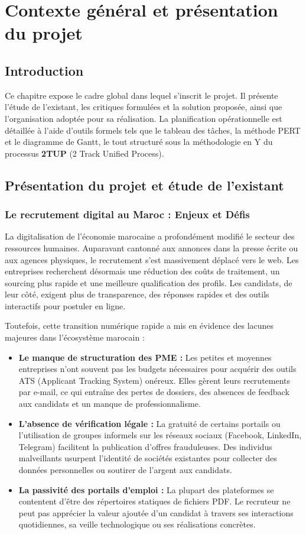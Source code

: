\chapter{Contexte général et présentation du projet}

\section{Introduction}
Ce chapitre expose le cadre global dans lequel s'inscrit le projet. Il présente l'étude de l'existant, les critiques formulées et la solution proposée, ainsi que l'organisation adoptée pour sa réalisation. La planification opérationnelle est détaillée à l'aide d'outils formels tels que le tableau des tâches, la méthode PERT et le diagramme de Gantt, le tout structuré sous la méthodologie en Y du processus \textbf{2TUP} (2 Track Unified Process).

\section{Présentation du projet et étude de l'existant}
\subsection{Le recrutement digital au Maroc : Enjeux et Défis}
La digitalisation de l'économie marocaine a profondément modifié le secteur des ressources humaines. Auparavant cantonné aux annonces dans la presse écrite ou aux agences physiques, le recrutement s'est massivement déplacé vers le web. Les entreprises recherchent désormais une réduction des coûts de traitement, un sourcing plus rapide et une meilleure qualification des profils. Les candidats, de leur côté, exigent plus de transparence, des réponses rapides et des outils interactifs pour postuler en ligne.

Toutefois, cette transition numérique rapide a mis en évidence des lacunes majeures dans l'écosystème marocain :
\begin{itemize}
    \item \textbf{Le manque de structuration des PME :} Les petites et moyennes entreprises n'ont souvent pas les budgets nécessaires pour acquérir des outils ATS (Applicant Tracking System) onéreux. Elles gèrent leurs recrutements par e-mail, ce qui entraîne des pertes de dossiers, des absences de feedback aux candidats et un manque de professionnalisme.
    \item \textbf{L'absence de vérification légale :} La gratuité de certains portails ou l'utilisation de groupes informels sur les réseaux sociaux (Facebook, LinkedIn, Telegram) facilitent la publication d'offres frauduleuses. Des individus malveillants usurpent l'identité de sociétés existantes pour collecter des données personnelles ou soutirer de l'argent aux candidats.
    \item \textbf{La passivité des portails d'emploi :} La plupart des plateformes se contentent d'être des répertoires statiques de fichiers PDF. Le recruteur ne peut pas apprécier la valeur ajoutée d'un candidat à travers ses interactions quotidiennes, sa veille technologique ou ses réalisations concrètes.
\end{itemize}

